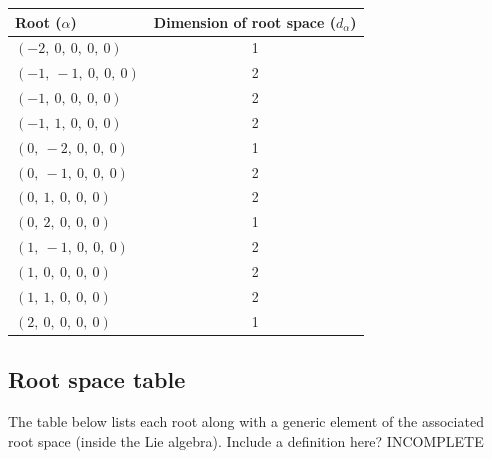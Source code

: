 \documentclass[11pt]{article}
\newcommand{\noi}{\noindent}
\theoremstyle{definition}
\begin{document}
\bigskip

\noindent \begin{tabular}{|l|c|}
    \hline
    \textbf{Root ($\alpha$)} & \textbf{Dimension of root space ($d_{\alpha}$)} \\
    \hline
    $\left( -2, \  0, \  0, \  0, \  0\right)$ & 1 \\
    \hline
    $\left( -1, \  -1, \  0, \  0, \  0\right)$ & 2 \\
    \hline
    $\left( -1, \  0, \  0, \  0, \  0\right)$ & 2 \\
    \hline
    $\left( -1, \  1, \  0, \  0, \  0\right)$ & 2 \\
    \hline
    $\left( 0, \  -2, \  0, \  0, \  0\right)$ & 1 \\
    \hline
    $\left( 0, \  -1, \  0, \  0, \  0\right)$ & 2 \\
    \hline
    $\left( 0, \  1, \  0, \  0, \  0\right)$ & 2 \\
    \hline
    $\left( 0, \  2, \  0, \  0, \  0\right)$ & 1 \\
    \hline
    $\left( 1, \  -1, \  0, \  0, \  0\right)$ & 2 \\
    \hline
    $\left( 1, \  0, \  0, \  0, \  0\right)$ & 2 \\
    \hline
    $\left( 1, \  1, \  0, \  0, \  0\right)$ & 2 \\
    \hline
    $\left( 2, \  0, \  0, \  0, \  0\right)$ & 1 \\
    \hline
\end{tabular}


\subsection{Root space table}

\noi The table below lists each root along with a generic element of the associated root space (inside the Lie algebra). Include a definition here? INCOMPLETE

\bigskip
\end{document}
